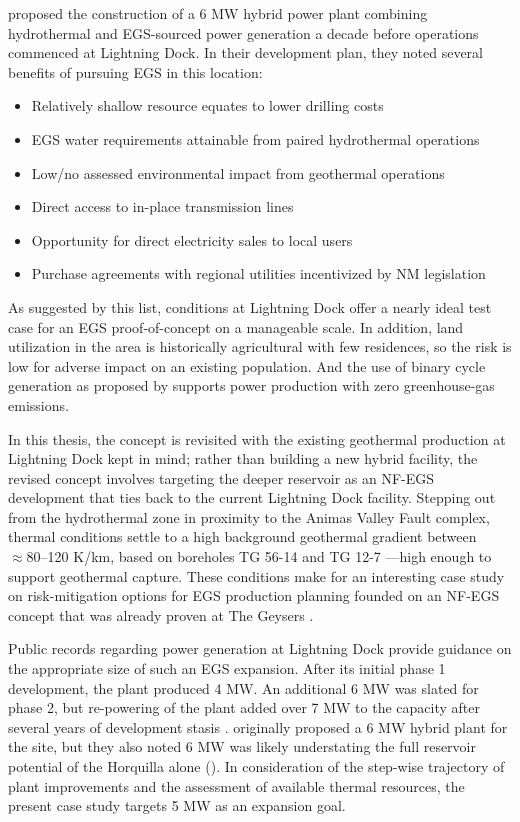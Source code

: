 \citet{schochet_development_2001} proposed the construction of a 6 MW hybrid power plant combining hydrothermal and EGS-sourced power generation a decade before operations commenced at Lightning Dock. In their development plan, they noted several benefits of pursuing EGS in this location:
\begin{itemize}[itemsep=2pt]\label{ch4:ld_egs_support}
    \item Relatively shallow resource equates to lower drilling costs
    \item EGS water requirements attainable from paired hydrothermal operations
    \item Low/no assessed environmental impact from geothermal operations
    \item Direct access to in-place transmission lines  
    \item Opportunity for direct electricity sales to local users
    \item Purchase agreements with regional utilities incentivized by NM legislation
\end{itemize}

As suggested by this list, conditions at Lightning Dock offer a nearly ideal test case for an EGS proof-of-concept on a manageable scale. In addition, land utilization in the area is historically agricultural with few residences, so the risk is low for adverse impact on an existing population. And the use of binary cycle generation as proposed by \citet{schochet_development_2001} supports power production with zero greenhouse-gas emissions.  

In this thesis, the \citeauthor{schochet_development_2001} concept is revisited with the existing geothermal production at Lightning Dock kept in mind; rather than building a new hybrid facility, the revised concept involves targeting the deeper reservoir as an NF-EGS development that ties back to the current Lightning Dock facility. Stepping out from the hydrothermal zone in proximity to the Animas Valley Fault complex, thermal conditions settle to a high background geothermal gradient between $\approx 80$--120 K/km, based on boreholes TG 56-14 and TG 12-7 \citep{cunniff_final_2003} ---high enough to support geothermal capture. These conditions make for an interesting case study on risk-mitigation options for EGS production planning founded on an NF-EGS concept that was already proven at The Geysers \citep{pan_establishment_2019}.

Public records regarding power generation at Lightning Dock provide guidance on the appropriate size of such an EGS expansion. After its initial phase 1 development, the plant produced 4 MW. An additional 6 MW was slated for phase 2, but re-powering of the plant added over 7 MW to the capacity after several years of development stasis \citep{think_geoenergy_turboden_2020}. \citeauthor{schochet_development_2001} originally proposed a 6 MW hybrid plant for the site, but they also noted 6 MW was likely understating the full reservoir potential of the Horquilla alone (\citeyear{schochet_development_2001}). In consideration of the step-wise trajectory of plant improvements and the assessment of available thermal resources, the present case study targets 5 MW as an expansion goal. 

